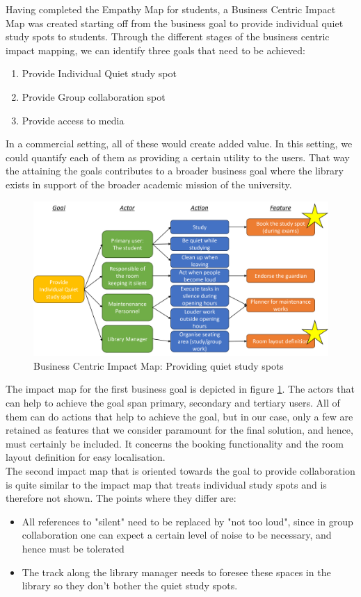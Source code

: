\documentclass[a4paper, 11pt]{article}
\begin{document}
Having completed the Empathy Map for students, a Business Centric Impact Map was created starting off from the business goal to provide individual quiet study spots to students. Through the different stages of the business centric impact mapping, we can identify three goals that need to be achieved: 
\begin{enumerate}
	\item Provide Individual Quiet study spot
	\item Provide Group collaboration spot
	\item Provide access to media
\end{enumerate}
In a commercial setting, all of these would create added value. In this setting, we could quantify each of them as providing a certain utility to the users. That way the attaining the goals contributes to a broader business goal where the library exists in support of the broader academic mission of the university.\\

\begin{figure}[h]
	\centering
	\includegraphics[width=0.7\linewidth]{figures/ImpactMapStudySpot}
	\caption{Business Centric Impact Map: Providing quiet study spots}
	\label{fig:impactmapstudyspot}
\end{figure}

The impact map for the first business goal is depicted in figure \ref{fig:impactmapstudyspot}. The actors that can help to achieve the goal span primary, secondary and tertiary users. All of them can do actions that help to achieve the goal, but in our case, only a few are retained as features that we consider paramount for the final solution, and hence, must certainly be included. It concerns the booking functionality and the room layout definition for easy localisation. \\

The second impact map that is oriented towards the goal to provide collaboration is quite similar to the impact map that treats individual study spots and is therefore not shown. The points where they differ are:
\begin{itemize}
	\item All references to "silent" need to be replaced by "not too loud", since in group collaboration one can expect a certain level of noise to be necessary, and hence must be tolerated
	\item The track along the library manager needs to foresee these spaces in the library so they don't bother the quiet study spots.
\end{itemize}
\end{document}
